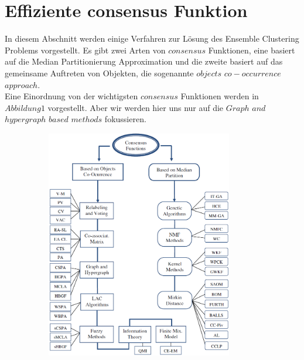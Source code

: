 \documentclass[runningheads]{llncs}
\begin{document}
\section{Effiziente consensus Funktion}
In diesem Abschnitt werden einige Verfahren zur Lösung des Ensemble Clustering Problems vorgestellt. 
Es gibt zwei Arten von $consensus$ Funktionen, eine basiert auf die Median Partitionierung Approximation und die zweite basiert auf das gemeinsame Auftreten von Objekten, die sogenannte $objects$ $co-occurrence$ $approach$.\\
Eine Einordnung von der wichtigsten  $consensus$ Funktionen werden in $Abbildung 1$ vorgestellt. Aber wir werden hier uns nur auf die $Graph$ $and$ $hypergraph$ $based$ $methods$ fokussieren.
\begin{figure}[t]
	\includegraphics[width=10cm, height=10cm]{Abbildung1}
\end{figure}
\end{document}
